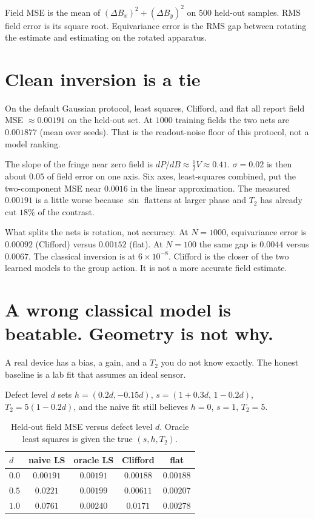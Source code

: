 \documentclass[11pt]{article}
\begin{document}
Field MSE is the mean of $(\Delta B_x)^2+(\Delta B_y)^2$ on $500$ held-out samples.
RMS field error is its square root.
Equivariance error is the RMS gap between rotating the estimate and estimating on the rotated apparatus.

\section{Clean inversion is a tie}

On the default Gaussian protocol, least squares, Clifford, and flat all report field MSE $\approx 0.00191$ on the held-out set.
At $1000$ training fields the two nets are $0.001877$ (mean over seeds).
That is the readout-noise floor of this protocol, not a model ranking.

The slope of the fringe near zero field is $dP/dB\approx\tfrac12 V\approx 0.41$.
$\sigma=0.02$ is then about $0.05$ of field error on one axis.
Six axes, least-squares combined, put the two-component MSE near $0.0016$ in the linear approximation.
The measured $0.00191$ is a little worse because $\sin$ flattens at larger phase and $T_2$ has already cut $18\%$ of the contrast.

What splits the nets is rotation, not accuracy.
At $N=1000$, equivariance error is $0.00092$ (Clifford) versus $0.00152$ (flat).
At $N=100$ the same gap is $0.0044$ versus $0.0067$.
The classical inversion is at $6\times 10^{-8}$.
Clifford is the closer of the two learned models to the group action.
It is not a more accurate field estimate.

\section{A wrong classical model is beatable. Geometry is not why.}

A real device has a bias, a gain, and a $T_2$ you do not know exactly.
The honest baseline is a lab fit that assumes an ideal sensor.

Defect level $d$ sets
$h=(0.2d,-0.15d)$,
$s=(1+0.3d,\,1-0.2d)$,
$T_2=5(1-0.2d)$,
and the naive fit still believes $h=0$, $s=1$, $T_2=5$.

\begin{table}[h]
\centering
\caption{Held-out field MSE versus defect level $d$. Oracle least squares is given the true $(s,h,T_2)$.}
\label{tab:misspec}
\begin{tabular}{lcccc}
\toprule
$d$ & naive LS & oracle LS & Clifford & flat \\
\midrule
$0.0$ & $0.00191$ & $0.00191$ & $0.00188$ & $0.00188$ \\
$0.5$ & $0.0221$  & $0.00199$ & $0.00611$ & $0.00207$ \\
$1.0$ & $0.0761$  & $0.00240$ & $0.0171$  & $0.00278$ \\
\bottomrule
\end{tabular}
\end{table}
\end{document}
